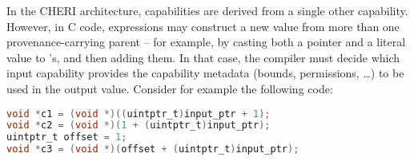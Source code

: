 \documentclass[12pt,twoside,openright,a4paper]{article}
\newcommand{\ccode}[1]{{\small\ttfamily{#1}}}
\newcommand{\cintptrt}{{\ccode{intptr\_t}}\xspace}
\newcommand{\note}[2]{{\color{blue}[ Note: #1 - #2]}}
\renewcommand{\note}[2]{\relax\ifhmode\unskip\fi}
\newcommand{\psnote}[1]{\note{#1}{Peter S.}}
\begin{document}
In the\psnote{singular ``the'', or ``CHERI architectures''?}  CHERI architecture, capabilities are derived from a single other
capability.
However, in C code, expressions may construct a new \cintptrt value from more
than one provenance-carrying parent \cintptrt{} -- for example, by casting both a
pointer and a literal value to \cintptrt{}'s, and then adding them.
\psnote{That literal value wouldn't have a non-empty provenance, so this isn't the best example.   Maybe better to have something like \texttt{p+(q1-q2)} ?}
\psnote{More generally, there is a bit of a mismatch between this and our C provenance treatment of \cintptrt, which there is a plain integer type with no provenance -- but which regains provenance in some cases when cast back to a pointer.  To ponder...}
In that case, the compiler must decide which input capability provides the
capability metadata (bounds, permissions, \ldots{}) to be used in the output
value.
Consider for example the following code:
\begin{lstlisting}[language=C]
void *c1 = (void *)((uintptr_t)input_ptr + 1);
void *c2 = (void *)(1 + (uintptr_t)input_ptr);
uintptr_t offset = 1;
void *c3 = (void *)(offset + (uintptr_t)input_ptr);
\end{lstlisting}
\end{document}
